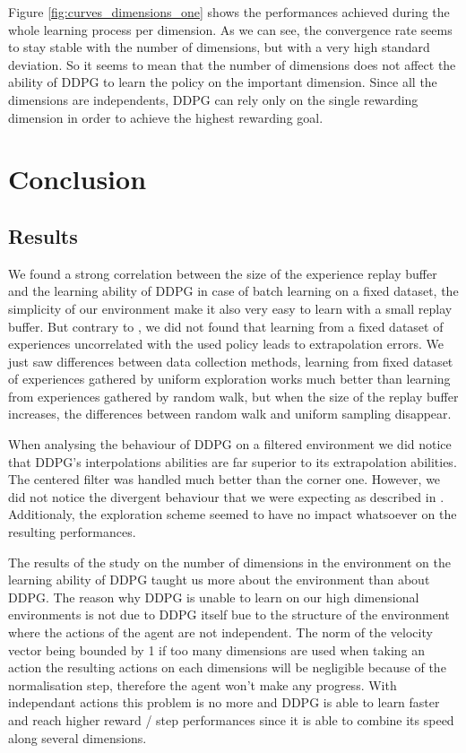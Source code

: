 \documentclass{article}
\begin{document}
Figure \ref{fig:curves_dimensions_one} shows the performances achieved during the whole learning process per dimension. As we can see, the convergence rate seems to stay stable with the number of dimensions, but with a very high standard deviation. So it seems to mean that the number of dimensions does not affect the ability of DDPG to learn the policy on the important dimension. Since all the dimensions are independents, DDPG can rely only on the single rewarding dimension in order to achieve the highest rewarding goal.

\section{Conclusion}

\subsection{Results}

We found a strong correlation between the size of the experience replay buffer and the learning ability of DDPG in case of batch learning on a fixed dataset, the simplicity of our environment make it also very easy to learn with a small replay buffer. But contrary to \cite{fujimoto_off-policy_2018}, we did not found that learning from a fixed dataset of experiences uncorrelated with the used policy leads to extrapolation errors. We just saw differences between data collection methods, learning from fixed dataset of experiences gathered by uniform exploration works much better than learning from experiences gathered by random walk, but when the size of the replay buffer increases, the differences between random walk and uniform sampling disappear.

When analysing the behaviour of DDPG on a filtered environment we did notice that DDPG's interpolations abilities are far superior to its extrapolation abilities. The centered filter was handled much better than the corner one. However, we did not notice the divergent behaviour that we were expecting as described in \cite{achiam_towards_2019}.
Additionaly, the exploration scheme seemed to have no impact whatsoever on the resulting performances.

The results of the study on the number of dimensions in the environment on the learning ability of DDPG taught us
more about the environment than about DDPG. The reason why DDPG is unable to learn on our high dimensional
environments is not due to DDPG itself bue to the structure of the environment where the actions of the agent are not
independent. The norm of the velocity vector being bounded by 1 if too many dimensions are used when taking an action the resulting actions on each dimensions will be negligible because of the normalisation step, therefore the agent won't make any progress. With independant actions this problem is no more and DDPG is able to learn faster and reach higher reward / step performances since it is able to combine its speed along several dimensions.
\end{document}
